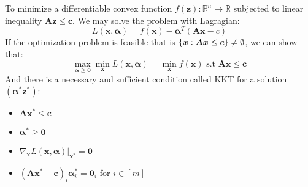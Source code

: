 \begin{proposition}
    To minimize a differentiable convex function $f(\boldsymbol z) : \mathbb{R}^n \rightarrow \mathbb{R}$ subjected to linear inequality $\boldsymbol A\boldsymbol z \le \boldsymbol c$. We may solve the problem with Lagragian:
    \begin{equation*}
        L(\boldsymbol x, \boldsymbol \alpha) = f(\boldsymbol x) - \boldsymbol \alpha^T(\boldsymbol A\boldsymbol x - c)
    \end{equation*}
    If the optimization problem is feasible that is $\left\{ \boldsymbol x : \boldsymbol A\boldsymbol x \le \boldsymbol c \right\} \ne \emptyset$, we can show that:
    \begin{equation*}
        \max_{\boldsymbol \alpha\ge\boldsymbol 0}\min_{\boldsymbol x}L(\boldsymbol x, \boldsymbol \alpha) = \min_{\boldsymbol x}f(\boldsymbol x) \text{ s.t } \boldsymbol A\boldsymbol x\le \boldsymbol c
    \end{equation*}
    And there is a necessary and sufficient condition called KKT for a solution $(\boldsymbol \alpha^*\boldsymbol z^*)$:
    \begin{itemize}
        \item $\boldsymbol A\boldsymbol x^* \le \boldsymbol c$
        \item $\boldsymbol \alpha^* \ge \boldsymbol 0$
        \item $\nabla_{\boldsymbol x}L(\boldsymbol x, \boldsymbol \alpha) | _{\boldsymbol x^*} = \boldsymbol 0$
        \item $(\boldsymbol A\boldsymbol x^* - \boldsymbol c)_i\boldsymbol \alpha^*_i = \boldsymbol 0_i$ for $i\in[m]$
    \end{itemize}
\end{proposition}

